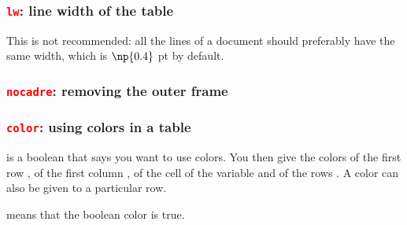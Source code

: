 \begin{tkzexample}[width=9cm,small]
\end{tkzexample}

\subsubsection{\texttt{\textcolor{red}{lw}}: line width of the table}
This is not recommended: all the lines of a document should preferably have the same width, which is $\np{0.4}$ pt by default.

\begin{tkzexample}[width=8cm,small]
\end{tkzexample}

\subsubsection{\texttt{\textcolor{red}{nocadre}}: removing the outer frame}

\begin{tkzexample}[width=8cm,small]
\end{tkzexample}

\subsubsection{\texttt{\textcolor{red}{color}}: using colors in a table}
 is a boolean that says you want to use colors. You then give the colors of the first row , of the first column , of the cell of the variable  and of the rows . A color can also be given to a particular row.

 means that the boolean color is true.

\begin{tkzexample}[width=8cm,small]
\end{tkzexample}

